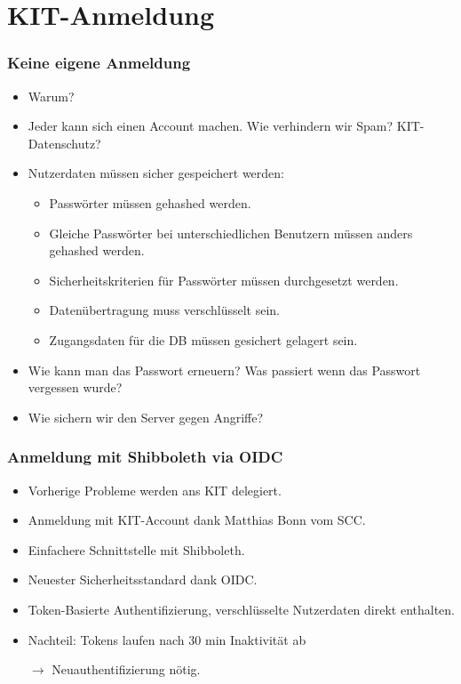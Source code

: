 \section{KIT-Anmeldung}

\begin{frame}\frametitle{Keine eigene Anmeldung}
    \begin{itemize}
        \item Warum? \pause
        \item Jeder kann sich einen Account machen. Wie verhindern wir Spam? KIT-Datenschutz?
        \item Nutzerdaten müssen sicher gespeichert werden: \begin{itemize}
            \item Passwörter müssen gehashed werden.
            \item Gleiche Passwörter bei unterschiedlichen Benutzern müssen anders gehashed werden.
            \item Sicherheitskriterien für Passwörter müssen durchgesetzt werden.
            \item Datenübertragung muss verschlüsselt sein.
            \item Zugangsdaten für die DB müssen gesichert gelagert sein.
        \end{itemize}
        \item Wie kann man das Passwort erneuern? Was passiert wenn das Passwort vergessen wurde?
        \item Wie sichern wir den Server gegen Angriffe?
    \end{itemize}
\end{frame}

\begin{frame}\frametitle{Anmeldung mit Shibboleth via OIDC}
    \begin{itemize}
        \item Vorherige Probleme werden ans KIT delegiert.
        \item Anmeldung mit KIT-Account dank Matthias Bonn vom SCC.
        \item Einfachere Schnittstelle mit Shibboleth.
        \item Neuester Sicherheitsstandard dank OIDC.
        \item Token-Basierte Authentifizierung, verschlüsselte Nutzerdaten direkt enthalten.
        \pause
        \item Nachteil: Tokens laufen nach 30 min Inaktivität ab
        \item[$\rightarrow$] Neuauthentifizierung nötig.
    \end{itemize}
\end{frame}

